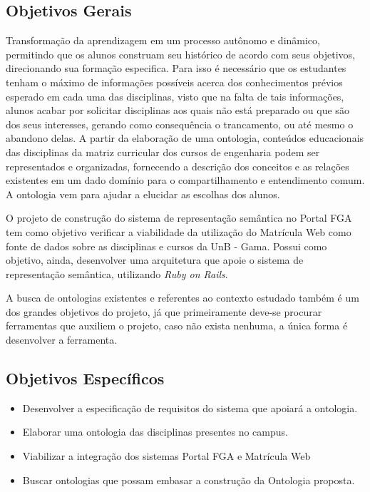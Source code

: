 
\subsection{Objetivos Gerais}

Transformação da aprendizagem em um processo autônomo e dinâmico, permitindo que os alunos construam seu histórico de acordo com seus objetivos, direcionando sua formação especifica. Para isso é necessário que os estudantes tenham o máximo de informações possíveis acerca dos conhecimentos prévios esperado em cada uma das disciplinas, visto que na falta de tais informações, alunos acabar por solicitar disciplinas aos quais não está preparado ou que são dos seus interesses, gerando como consequência o trancamento, ou até mesmo o abandono delas. A partir da elaboração de uma ontologia, conteúdos educacionais das disciplinas da matriz curricular dos cursos de engenharia podem ser representados e organizadas, fornecendo a descrição dos conceitos e as relações existentes em um dado domínio para o compartilhamento e entendimento comum. A ontologia vem para ajudar a elucidar as escolhas dos alunos.

O projeto de construção do sistema de representação semântica no Portal FGA tem como objetivo verificar a viabilidade da utilização do Matrícula Web como fonte de dados sobre as disciplinas e cursos da UnB - Gama. Possui como objetivo, ainda, desenvolver uma arquitetura que apoie o sistema de representação semântica, utilizando \textit{Ruby on Rails}.

A busca de ontologias existentes e referentes ao contexto estudado também é um dos grandes objetivos do projeto, já que primeiramente deve-se procurar ferramentas que auxiliem o projeto, caso não exista nenhuma, a única forma é desenvolver a ferramenta.

\subsection{Objetivos Específicos}

	\begin{itemize}
		\item Desenvolver a especificação de requisitos do sistema que apoiará a ontologia.

		\item Elaborar uma ontologia das disciplinas presentes no campus.

		\item Viabilizar a integração dos sistemas Portal FGA e Matrícula Web

		\item Buscar ontologias que possam embasar a construção da Ontologia proposta.

	\end{itemize}